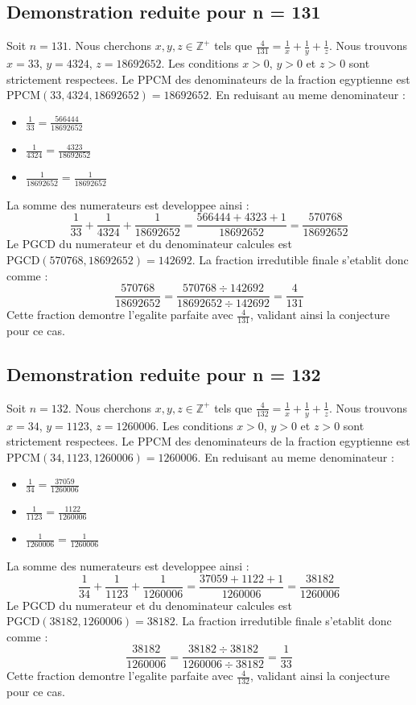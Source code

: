 \documentclass[11pt,a4paper]{article}
\begin{document}
\subsection{Demonstration reduite pour n = 131}
Soit $n = 131$. Nous cherchons $x, y, z \in \mathbb{Z}^{+}$ tels que $\frac{4}{131} = \frac{1}{x} + \frac{1}{y} + \frac{1}{z}$.
Nous trouvons $x = 33$, $y = 4324$, $z = 18692652$.
Les conditions $x > 0$, $y > 0$ et $z > 0$ sont strictement respectees.
Le PPCM des denominateurs de la fraction egyptienne est $\text{PPCM}(33, 4324, 18692652) = 18692652$.
En reduisant au meme denominateur :
\begin{itemize}
    \item $\frac{1}{33} = \frac{566444}{18692652}$
    \item $\frac{1}{4324} = \frac{4323}{18692652}$
    \item $\frac{1}{18692652} = \frac{1}{18692652}$
\end{itemize}
La somme des numerateurs est developpee ainsi :
$$ \frac{1}{33} + \frac{1}{4324} + \frac{1}{18692652} = \frac{566444 + 4323 + 1}{18692652} = \frac{570768}{18692652} $$
Le PGCD du numerateur et du denominateur calcules est $\text{PGCD}(570768, 18692652) = 142692$.
La fraction irredutible finale s'etablit donc comme :
$$ \frac{570768}{18692652} = \frac{570768 \div 142692}{18692652 \div 142692} = \frac{4}{131} $$
Cette fraction demontre l'egalite parfaite avec $\frac{4}{131}$, validant ainsi la conjecture pour ce cas.

\subsection{Demonstration reduite pour n = 132}
Soit $n = 132$. Nous cherchons $x, y, z \in \mathbb{Z}^{+}$ tels que $\frac{4}{132} = \frac{1}{x} + \frac{1}{y} + \frac{1}{z}$.
Nous trouvons $x = 34$, $y = 1123$, $z = 1260006$.
Les conditions $x > 0$, $y > 0$ et $z > 0$ sont strictement respectees.
Le PPCM des denominateurs de la fraction egyptienne est $\text{PPCM}(34, 1123, 1260006) = 1260006$.
En reduisant au meme denominateur :
\begin{itemize}
    \item $\frac{1}{34} = \frac{37059}{1260006}$
    \item $\frac{1}{1123} = \frac{1122}{1260006}$
    \item $\frac{1}{1260006} = \frac{1}{1260006}$
\end{itemize}
La somme des numerateurs est developpee ainsi :
$$ \frac{1}{34} + \frac{1}{1123} + \frac{1}{1260006} = \frac{37059 + 1122 + 1}{1260006} = \frac{38182}{1260006} $$
Le PGCD du numerateur et du denominateur calcules est $\text{PGCD}(38182, 1260006) = 38182$.
La fraction irredutible finale s'etablit donc comme :
$$ \frac{38182}{1260006} = \frac{38182 \div 38182}{1260006 \div 38182} = \frac{1}{33} $$
Cette fraction demontre l'egalite parfaite avec $\frac{4}{132}$, validant ainsi la conjecture pour ce cas.
\end{document}
